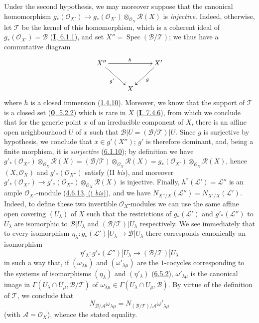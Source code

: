Under the second hypothesis, we may moreover suppose that the canonical
homomorphism
$g_*(\mathcal{O}_{X'})\to
g_*(\mathcal{O}_{X'})\otimes_{\mathcal{O}_X}\mathcal{R}(X)$ is
\emph{injective}. Indeed, otherwise, let $\mathcal{T}$
be the kernel of this homomorphism, which is a coherent ideal of
$g_*(\mathcal{O}_{X'})=\mathcal{B}$
(\hyperref[I.6.1.1]{\textbf{I}, 6.1.1}), and set
$X''=\operatorname{Spec}(\mathcal{B}/\mathcal{T})$; we thus have a
commutative diagram
\[
\xymatrix{
X''\ar[rr]^h\ar[dr]_{g'} && X'\ar[dl]^g\\
& X
}
\]
where $h$ is a closed immersion (\hyperref[II.1.4.10]{1.4.10}). Moreover,
we know that the support of $\mathcal{T}$ is a closed set
(\hyperref[0.5.2.2]{\textbf{0}, 5.2.2}) which is rare in $X$
(\hyperref[I.7.4.6]{\textbf{I}, 7.4.6}), from which we conclude that for the generic
point $x$ of an irreducible component of $X$, there is an affine open
neighbourhood $U$ of $x$ such that
$\mathcal{B}|U=(\mathcal{B}/\mathcal{T})|U$. Since $g$ is surjective by
hypothesis, we conclude that $x\in g'(X'')$; $g'$ is therefore dominant, and,
being a finite morphism, it is \emph{surjective}
(\hyperref[II.6.1.10]{6.1.10}); by definition we have $g'_*(\mathcal{O}_{X''})\otimes_{\mathcal{O}_X}\mathcal{R}(X)
=(\mathcal{B}/\mathcal{T})\otimes_{\mathcal{O}_X}\mathcal{R}(X)
=g_*(\mathcal{O}_{X'})\otimes_{\mathcal{O}_X}\mathcal{R}(X)$,
hence $(X,\mathcal{O}_X)$ and $g'_*(\mathcal{O}_{X''})$ satisfy
(II \emph{bis}), and moreover $g'_*(\mathcal{O}_{X''})\to
g'_*(\mathcal{O}_{X''})\otimes_{\mathcal{O}_X}\mathcal{R}(X)$
is injective. Finally, $h^*(\mathcal{L}')=\mathcal{L}''$ is an ample
$\mathcal{O}_{X''}$-module
(\hyperref[II.4.6.13]{4.6.13, (i \emph{bis})}), and we have
$N_{X''/X}(\mathcal{L}'')=N_{X'/X}(\mathcal{L}')$. Indeed, to define
these two invertible $\mathcal{O}_X$-modules we can use the same
affine open covering $(U_\lambda)$ of $X$ such that the restrictions of
$g_*(\mathcal{L}')$ and $g'_*(\mathcal{L}'')$ to $U_\lambda$ are
isomorphic to $\mathcal{B}|U_\lambda$ and
$(\mathcal{B}/\mathcal{T})|U_\lambda$ respectively. We see immediately that to
every isomorphism $\eta_\lambda:g_*(\mathcal{L}')|U_\lambda\to\mathcal{B}|U_\lambda$
there corresponds canonically an isomorphism
\[
\eta'_\lambda:g'_*(\mathcal{L}'')|U_\lambda\longrightarrow
(\mathcal{B}/\mathcal{T})|U_\lambda
\]
in such a way that, if $(\omega_{\lambda\mu})$ and
$(\omega'_{\lambda\mu})$ are the $1$-cocycles corresponding to the systems
of isomorphisms $(\eta_\lambda)$ and $(\eta'_\lambda)$
(\hyperref[II.6.5.2]{6.5.2}), $\omega'_{\lambda\mu}$ is the canonical
image in
$\Gamma(U_\lambda\cap U_\mu,\mathcal{B}/\mathcal{T})$ of
$\omega_{\lambda\mu}\in\Gamma(U_\lambda\cap U_\mu,\mathcal{B})$. By virtue
of the definition of $\mathcal{T}$, we conclude that
\[
N_{\mathcal{B}/\mathcal{A}}\omega_{\lambda\mu}
=N_{(\mathcal{B}/\mathcal{T})/\mathcal{A}}\omega'_{\lambda\mu}
\]
(with $\mathcal{A}=\mathcal{O}_X$), whence the stated equality.


